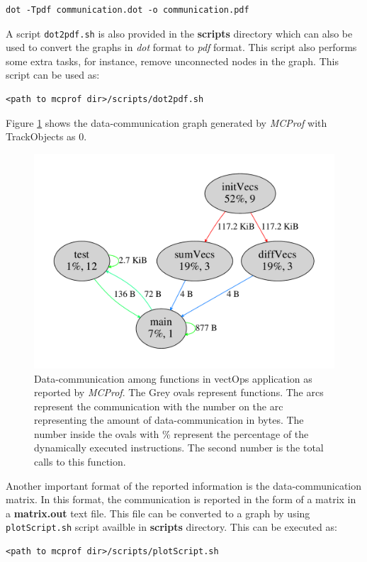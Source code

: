 \documentclass[10pt]{article}
\newcommand{\MCPROF}{\emph{MCProf}}
\begin{document}
{
\small
\begin{Verbatim}[frame=single]
dot -Tpdf communication.dot -o communication.pdf
\end{Verbatim}
}

A script \verb|dot2pdf.sh| is also provided in the \textbf{scripts} directory which can
also be used to convert the graphs in \emph{dot} format to \emph{pdf} format. This script
also performs some extra tasks, for instance, remove unconnected nodes in the
graph. This script can be used as:

{
\small
\begin{Verbatim}[frame=single]
<path to mcprof dir>/scripts/dot2pdf.sh
\end{Verbatim}
}

Figure \ref{fig:comm} shows the data-communication graph generated by \MCPROF{}
with TrackObjects as 0.

\begin{figure}[!h]
\centering
\includegraphics[width=0.55\linewidth]{figures/comm.pdf}
\caption{Data-communication among functions in vectOps application as reported
    by \MCPROF{}. The Grey ovals represent functions. The arcs represent the
    communication with the number on the arc representing the amount of
    data-communication in bytes. The number inside the ovals with \% represent
    the percentage of the dynamically executed instructions. The second number
    is the total calls to this function.}
\label{fig:comm}
\end{figure}

Another important format of the reported information is the data-communication 
matrix. In this format, the communication is reported in the form of a matrix in 
a \textbf{matrix.out} text file. This file can be converted to a graph by using 
\verb|plotScript.sh| script availble in \textbf{scripts} directory. This can be 
executed as:

{
\small
\begin{Verbatim}[frame=single]
<path to mcprof dir>/scripts/plotScript.sh
\end{Verbatim}
}
\end{document}
